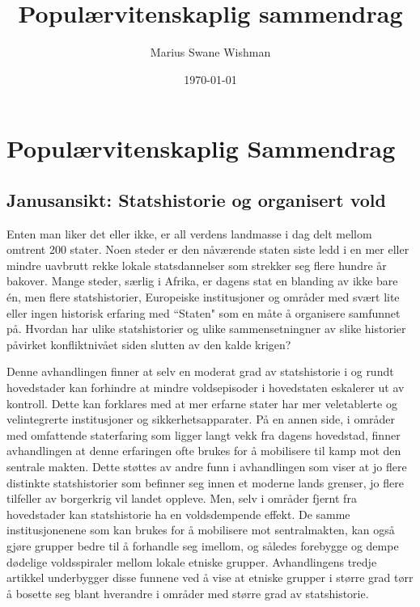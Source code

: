 \documentclass[12pt]{article}
\title{Populærvitenskaplig sammendrag}
\author[1]{Marius Swane Wishman}
\affil[1]{Department of Sociology and Political Science, NTNU}
\date{\today}
\begin{document}


\section{Populærvitenskaplig Sammendrag}

\subsection{Janusansikt: Statshistorie og organisert vold}

Enten man liker det eller ikke, er all verdens landmasse i dag delt mellom
omtrent 200 stater. Noen steder er den nåværende staten siste ledd i en mer
eller mindre uavbrutt rekke lokale statsdannelser som strekker seg flere hundre
år bakover. Mange steder, særlig i Afrika, er dagens stat en blanding av ikke
bare én, men flere statshistorier, Europeiske institusjoner og områder med
svært lite eller ingen historisk erfaring med ``Staten" som en måte å organisere
samfunnet på. Hvordan har ulike statshistorier og ulike sammensetningner av
slike historier påvirket konfliktnivået siden slutten av den kalde krigen?

Denne avhandlingen finner at selv en moderat grad av statshistorie i og rundt
hovedstader kan forhindre at mindre voldsepisoder i hovedstaten eskalerer ut av
kontroll. Dette kan forklares med at mer erfarne stater har mer veletablerte og
velintegrerte institusjoner og sikkerhetsapparater. På en annen side, i områder
med omfattende staterfaring som ligger langt vekk fra dagens hovedstad, finner
avhandlingen at denne erfaringen ofte brukes for å mobilisere til kamp mot den
sentrale makten. Dette støttes av andre funn i avhandlingen som viser at jo
flere distinkte statshistorier som befinner seg innen et moderne lands grenser,
jo flere tilfeller av borgerkrig vil landet oppleve. Men, selv i områder fjernt
fra hovedstader kan statshistorie ha en voldsdempende effekt. De samme
institusjonenene som kan brukes for å mobilisere mot sentralmakten, kan også
gjøre grupper bedre til å forhandle seg imellom, og således forebygge og dempe
dødelige voldsspiraler mellom lokale etniske grupper. Avhandlingens tredje
artikkel underbygger disse funnene ved å vise at etniske grupper i større grad
tørr å bosette seg blant hverandre i områder med større grad av statshistorie.
\end{document}
